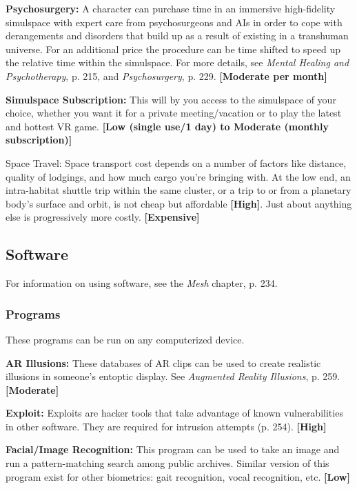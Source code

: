 \textbf{Psychosurgery:} A character can purchase time in an immersive high-fidelity simulspace with expert care from psychosurgeons and AIs in order to cope with derangements and disorders that build up as a result of existing in a transhuman universe. For an additional price the procedure can be time shifted to speed up the relative time within the simulspace. For more details, see \emph{Mental Healing and Psychotherapy}, p. 215, and \emph{Psychosurgery}, p. 229. \textbf{[Moderate per month]}

\textbf{Simulspace Subscription:} This will by you access to the simulspace of your choice, whether you want it for a private meeting/vacation or to play the latest and hottest VR game. \textbf{[Low (single use/1 day) to Moderate (monthly subscription)]}

Space Travel: Space transport cost depends on a number of factors like distance, quality of lodgings, and how much cargo you’re bringing with. At the low end, an intra-habitat shuttle trip within the same cluster, or a trip to or from a planetary body’s surface and orbit, is not cheap but affordable \textbf{[High]}. Just about anything else is progressively more costly. \textbf{[Expensive]}

\subsection{Software}
\label{sec:software}

For information on using software, see the \emph{Mesh} chapter, p. 234.

\subsubsection{Programs}

These programs can be run on any computerized device.

\textbf{AR Illusions: }These databases of AR clips can be used to create realistic illusions in someone’s entoptic display. See \emph{Augmented Reality Illusions}, p. 259. \textbf{[Moderate]}

\textbf{Exploit:} Exploits are hacker tools that take advantage of known vulnerabilities in other software. They are required for intrusion attempts (p. 254). \textbf{[High]}

\textbf{Facial/Image Recognition:} This program can be used to take an image and run a pattern-matching search among public archives. Similar version of this program exist for other biometrics: gait recognition, vocal recognition, etc. \textbf{[Low]}

